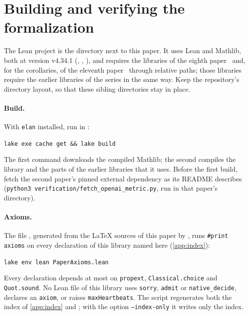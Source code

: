 \section{Building and verifying the formalization}\label{app:verify}

The Lean project is the directory  next to this paper. It uses Lean and Mathlib, both at version v4.34.1
(, , ), and requires the libraries of the eighth
paper~\cite{EighthPaper2026} and, for the corollaries, of the eleventh paper~\cite{MergeDepth2026} through relative paths; those
libraries require the earlier libraries of the series in the same way.
Keep the repository's directory layout, so that these sibling directories stay in place.

\paragraph{Build.} With \texttt{elan} installed, run in :
\begin{center}
\texttt{lake exe cache get \&\& lake build}
\end{center}
The first command downloads the compiled Mathlib; the second compiles the library and the parts of the earlier libraries that it
uses. Before the first build, fetch the second paper's pinned external dependency as its README describes
(\texttt{python3 verification/fetch\_openai\_metric.py}, run in that paper's directory).

\paragraph{Axioms.} The file , generated from the \LaTeX{} sources of this paper by
, runs \texttt{\#print axioms} on every declaration of this library named here (\cref{app:index}):
\begin{center}
\texttt{lake env lean PaperAxioms.lean}
\end{center}
Every declaration depends at most on \texttt{propext}, \texttt{Classical.choice} and \texttt{Quot.sound}. No Lean file of this
library uses \texttt{sorry}, \texttt{admit} or \texttt{native\_decide}, declares an \texttt{axiom}, or raises
\texttt{maxHeartbeats}. The script regenerates both the index of \cref{app:index} and ; with the
option \texttt{--index-only} it writes only the index.

